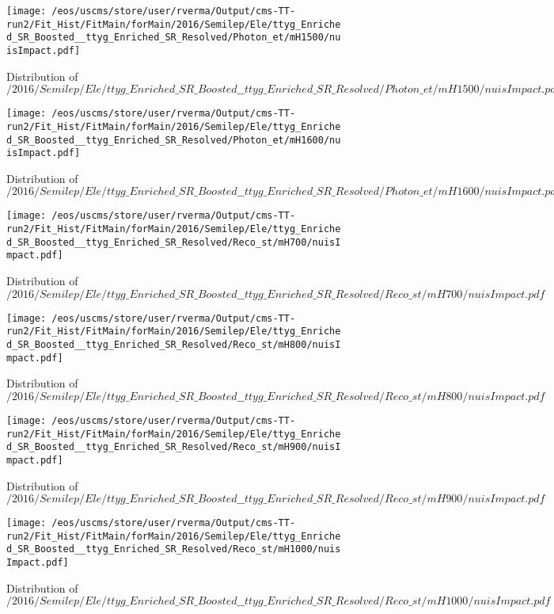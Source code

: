 \begin{figure}
\centering
\texttt{[image: /eos/uscms/store/user/rverma/Output/cms-TT-run2/Fit\_Hist/FitMain/forMain/2016/Semilep/Ele/ttyg\_Enriched\_SR\_Boosted\_\_ttyg\_Enriched\_SR\_Resolved/Photon\_et/mH1500/nuisImpact.pdf]}
\caption{Distribution of $/2016/Semilep/Ele/ttyg\_Enriched\_SR\_Boosted\_\_ttyg\_Enriched\_SR\_Resolved/Photon\_et/mH1500/nuisImpact.pdf$}
\end{figure}

\begin{figure}
\centering
\texttt{[image: /eos/uscms/store/user/rverma/Output/cms-TT-run2/Fit\_Hist/FitMain/forMain/2016/Semilep/Ele/ttyg\_Enriched\_SR\_Boosted\_\_ttyg\_Enriched\_SR\_Resolved/Photon\_et/mH1600/nuisImpact.pdf]}
\caption{Distribution of $/2016/Semilep/Ele/ttyg\_Enriched\_SR\_Boosted\_\_ttyg\_Enriched\_SR\_Resolved/Photon\_et/mH1600/nuisImpact.pdf$}
\end{figure}

\begin{figure}
\centering
\texttt{[image: /eos/uscms/store/user/rverma/Output/cms-TT-run2/Fit\_Hist/FitMain/forMain/2016/Semilep/Ele/ttyg\_Enriched\_SR\_Boosted\_\_ttyg\_Enriched\_SR\_Resolved/Reco\_st/mH700/nuisImpact.pdf]}
\caption{Distribution of $/2016/Semilep/Ele/ttyg\_Enriched\_SR\_Boosted\_\_ttyg\_Enriched\_SR\_Resolved/Reco\_st/mH700/nuisImpact.pdf$}
\end{figure}

\begin{figure}
\centering
\texttt{[image: /eos/uscms/store/user/rverma/Output/cms-TT-run2/Fit\_Hist/FitMain/forMain/2016/Semilep/Ele/ttyg\_Enriched\_SR\_Boosted\_\_ttyg\_Enriched\_SR\_Resolved/Reco\_st/mH800/nuisImpact.pdf]}
\caption{Distribution of $/2016/Semilep/Ele/ttyg\_Enriched\_SR\_Boosted\_\_ttyg\_Enriched\_SR\_Resolved/Reco\_st/mH800/nuisImpact.pdf$}
\end{figure}

\begin{figure}
\centering
\texttt{[image: /eos/uscms/store/user/rverma/Output/cms-TT-run2/Fit\_Hist/FitMain/forMain/2016/Semilep/Ele/ttyg\_Enriched\_SR\_Boosted\_\_ttyg\_Enriched\_SR\_Resolved/Reco\_st/mH900/nuisImpact.pdf]}
\caption{Distribution of $/2016/Semilep/Ele/ttyg\_Enriched\_SR\_Boosted\_\_ttyg\_Enriched\_SR\_Resolved/Reco\_st/mH900/nuisImpact.pdf$}
\end{figure}

\begin{figure}
\centering
\texttt{[image: /eos/uscms/store/user/rverma/Output/cms-TT-run2/Fit\_Hist/FitMain/forMain/2016/Semilep/Ele/ttyg\_Enriched\_SR\_Boosted\_\_ttyg\_Enriched\_SR\_Resolved/Reco\_st/mH1000/nuisImpact.pdf]}
\caption{Distribution of $/2016/Semilep/Ele/ttyg\_Enriched\_SR\_Boosted\_\_ttyg\_Enriched\_SR\_Resolved/Reco\_st/mH1000/nuisImpact.pdf$}
\end{figure}

